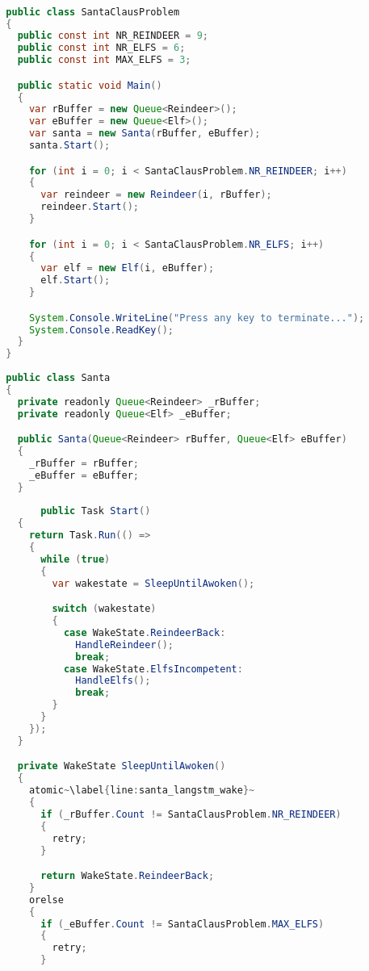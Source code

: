 \begin{lstlisting}[label=lst:impl_santa_lang,
  caption={\stmname Based Santa Claus Implementation},
  language=Java,  
  showspaces=false,
  showtabs=false,
  breaklines=true,
  showstringspaces=false,
  breakatwhitespace=true,
  commentstyle=\color{greencomments},
  keywordstyle=\color{bluekeywords},
  stringstyle=\color{redstrings},
  escapechar=~,
  morekeywords={atomic, retry, orelse, var, get, set, ref, out, readonly, virtual, override, region, endregion, foreach, lock}]  % Start your code-block

  public class SantaClausProblem
  {
    public const int NR_REINDEER = 9;
    public const int NR_ELFS = 6;
    public const int MAX_ELFS = 3;

    public static void Main()
    {
      var rBuffer = new Queue<Reindeer>();
      var eBuffer = new Queue<Elf>();
      var santa = new Santa(rBuffer, eBuffer);
      santa.Start();

      for (int i = 0; i < SantaClausProblem.NR_REINDEER; i++)
      {
        var reindeer = new Reindeer(i, rBuffer);
        reindeer.Start();
      }

      for (int i = 0; i < SantaClausProblem.NR_ELFS; i++)
      {
        var elf = new Elf(i, eBuffer);
        elf.Start();
      }

      System.Console.WriteLine("Press any key to terminate...");
      System.Console.ReadKey();
    }
  }
  
  public class Santa
  {
    private readonly Queue<Reindeer> _rBuffer;
    private readonly Queue<Elf> _eBuffer;

    public Santa(Queue<Reindeer> rBuffer, Queue<Elf> eBuffer)
    {
      _rBuffer = rBuffer;
      _eBuffer = eBuffer;
    }
        
        public Task Start()
    {
      return Task.Run(() =>
      {
        while (true)
        {
          var wakestate = SleepUntilAwoken();

          switch (wakestate)
          {
            case WakeState.ReindeerBack:
              HandleReindeer();
              break;
            case WakeState.ElfsIncompetent:
              HandleElfs();
              break;
          }
        }
      });
    }

    private WakeState SleepUntilAwoken()
    {
      atomic~\label{line:santa_langstm_wake}~
      {
        if (_rBuffer.Count != SantaClausProblem.NR_REINDEER)
        {
          retry;
        }

        return WakeState.ReindeerBack;
      }
      orelse
      {
        if (_eBuffer.Count != SantaClausProblem.MAX_ELFS)
        {
          retry;
        }


\end{lstlisting}
